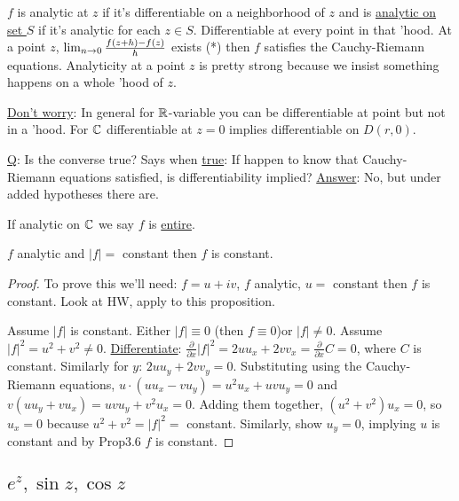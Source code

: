 \documentclass[]{article}
\begin{document}
\begin{definition}
	$f$ is analytic at $z$ if it's differentiable on a neighborhood of $z$ and is \underline{analytic on set $S$} if it's analytic for each $z\in S$. Differentiable at every point in that 'hood. At a point $z$, $\lim_{n\rightarrow0} \frac{f(z+h)-f(z)}{h} $ exists (*) then $f$ satisfies the Cauchy-Riemann equations.
	Analyticity at a point $z$ is pretty strong because we insist something happens on a whole 'hood of $z$.
\end{definition}
\begin{note}
	\underline{Don't worry}: In general for $\mathbb{R}$-variable you can be differentiable at point but not in a 'hood. For $\mathbb{C}$ differentiable at $z=0$ implies differentiable on $D(r,0)$.
\end{note}
\begin{proposition}\underline{Q}: Is the converse true? 
	Says when \underline{true}: If happen to know that Cauchy-Riemann equations satisfied, is differentiability implied? \underline{Answer}: No, but under added hypotheses there are.
\end{proposition}
\begin{definition}
	If analytic on $\mathbb{C}$ we say $f$ is \underline{entire}.
\end{definition}
\begin{proposition}
	$f$ analytic and $|f| = $ constant then $f$ is constant.
\end{proposition}
\begin{proof}
	To prove this we'll need: $f=u+iv$, $f$ analytic, $u = $ constant then $f$ is constant. Look at HW, apply to this proposition.
	
	Assume $|f|$ is constant. Either $|f|\equiv0$ (then $f\equiv 0$)or $|f|\neq 0$. Assume $|f|^2 = u^2 + v^2\neq0$. \underline{Differentiate}: $\frac{\partial}{\partial x} |f|^2 = 2uu_x + 2vv_x = \frac{\partial}{\partial x} C = 0$, where $C$ is constant. Similarly for $y$: $2uu_y+2vv_y = 0$. Substituting using the Cauchy-Riemann equations, $u\cdot(uu_x-vu_y)=u^2u_x+uvu_y=0$ and $v(uu_y+vu_x) = uvu_y+v^2u_x= 0$. Adding them together, $(u^2+v^2)u_x = 0$, so $u_x=0$ because $u^2+v^2= |f|^2 = $ constant. Similarly, show $u_y=0$, implying $u$ is constant and by Prop3.6 $f$ is constant.
\end{proof}

\subsection{$e^z, \sin{z}, \cos{z}$}
\end{document}
